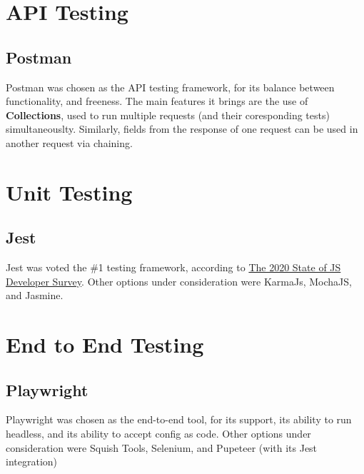 \section{API Testing}

\subsection{Postman}
Postman was chosen as the API testing framework, for its balance between functionality, and freeness.
The main features it brings are the use of \textbf{Collections}, used to run multiple requests (and their coresponding tests) simultaneouslty. 
Similarly, fields from the response of one request can be used in another request via chaining.

\section{Unit Testing}
\subsection{Jest}
Jest was voted the \#1 testing framework, according to \href{https://2020.stateofjs.com/en-US/technologies/testing/}{The 2020 State of JS Developer Survey}. 
Other options under consideration were KarmaJs, MochaJS, and Jasmine.

\section{End to End Testing}
\subsection{Playwright}
Playwright was chosen as the end-to-end tool, for its support, its ability to run headless, and its ability to accept config as code.
Other options under consideration were Squish Tools, Selenium, and Pupeteer (with its Jest integration)
